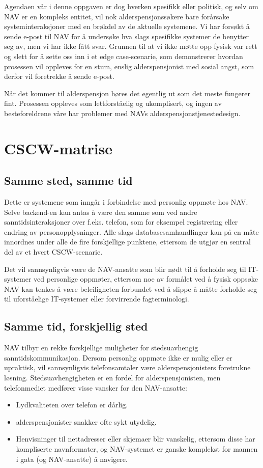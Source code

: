 \documentclass[informationsecurity]{gucmasterproject}
\begin{document}
Agendaen vår i denne oppgaven er dog hverken spesifikk eller politisk, og selv om NAV er en kompleks entitet, vil nok alderspensjonssøkere bare forårsake systeminteraksjoner med en brøkdel av de aktuelle systemene. Vi har forsøkt å sende e-post til NAV for å undersøke hva slags spesifikke systemer de benytter seg av, men vi har ikke fått svar. Grunnen til at vi ikke møtte opp fysisk var rett og slett for å sette oss inn i et edge case-scenarie, som demonstrerer hvordan prosessen vil oppleves for en stum, enslig alderspensjonist med sosial angst, som derfor vil foretrekke å sende e-post.

Når det kommer til alderspensjon høres det egentlig ut som det meste fungerer fint. Prosessen oppleves som lettforståelig og ukomplisert, og ingen av besteforeldrene våre har problemer med NAVs alderspensjonstjenestedesign.

\section{CSCW-matrise}
\subsection{Samme sted, samme tid}
Dette er systemene som inngår i forbindelse med personlig oppmøte hos NAV. Selve backend-en kan antas å være den samme som ved andre sanntidsinteraksjoner over f.eks. telefon, som for eksempel registrering eller endring av personopplysninger. Alle slags databasesamhandlinger kan på en måte innordnes under alle de fire forskjellige punktene, ettersom de utgjør en sentral del av et hvert CSCW-scenarie.

Det vil sannsynligvis være de NAV-ansatte som blir nødt til å forholde seg til IT-systemer ved personlige oppmøter, ettersom noe av formålet ved å fysisk oppsøke NAV kan tenkes å være beleiligheten forbundet ved å slippe å måtte forholde seg til uforståelige IT-systemer eller forvirrende fagterminologi.

\subsection{Samme tid, forskjellig sted}
NAV tilbyr en rekke forskjellige muligheter for stedsuavhengig sanntidskommunikasjon. Dersom personlig oppmøte ikke er mulig eller er upraktisk, vil sannsynligvis telefonsamtaler være alderspensjonisters foretrukne løsning. Stedsuavhengigheten er en fordel for alderspensjonisten, men telefonmediet medfører visse vansker for den NAV-ansatte:
\begin{itemize}
\item Lydkvaliteten over telefon er dårlig.
\item alderspensjonister snakker ofte sykt utydelig.
\item Henvisninger til nettadresser eller skjemaer blir vanskelig, ettersom disse har kompliserte navnformater, og NAV-systemet er ganske komplekst for mannen i gata (og NAV-ansatte) å navigere.
\end{itemize}
\end{document}
